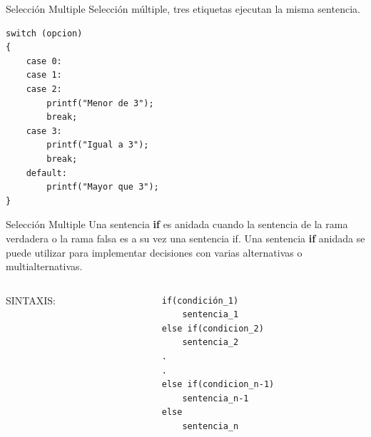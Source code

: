 \begin{frame}[c,fragile]{Selección Multiple}
\centering
Selección múltiple, tres etiquetas ejecutan la misma sentencia.
\begin{lstlisting}
switch (opcion)
{
    case 0:
    case 1:
    case 2:
        printf("Menor de 3");
        break;
    case 3:
        printf("Igual a 3");
        break;
    default:
        printf("Mayor que 3");
}
\end{lstlisting}
\end{frame}


\begin{frame}[t, fragile]{Selección Multiple}
Una sentencia \textbf{if} es anidada cuando la sentencia de la rama verdadera o la rama falsa es a su vez una sentencia if. Una sentencia \textbf{if} anidada se puede utilizar para implementar decisiones con varias alternativas o multialternativas.
\begin{columns}
    \begin{column}{0.40 \textwidth}
        \centering
        {\LARGE SINTAXIS:}
    \end{column}
    \begin{column}{0.40 \textwidth}
        \vspace{1.5mm}
        \begin{lstlisting}
if(condición_1)
    sentencia_1
else if(condicion_2)
    sentencia_2
.
.
else if(condicion_n-1)
    sentencia_n-1
else
    sentencia_n
        \end{lstlisting}
    \end{column}	
\end{columns}
\end{frame}


